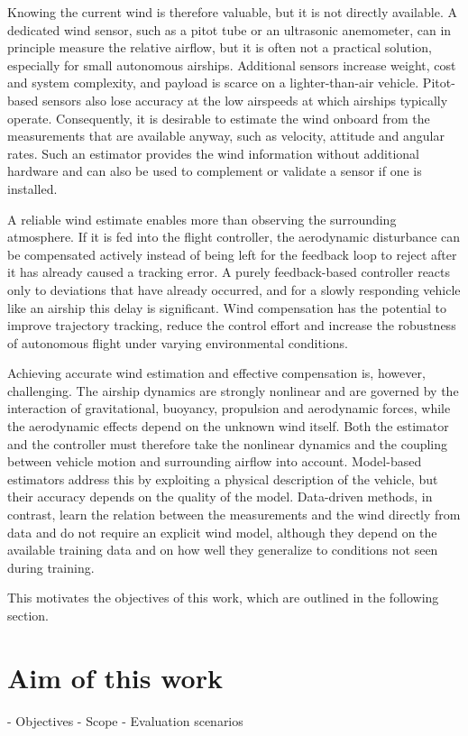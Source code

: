 Knowing the current wind is therefore valuable, but it is not directly available. A dedicated wind sensor, such as a pitot tube or an ultrasonic anemometer, can in principle measure the relative airflow, but it is often not a practical solution, especially for small autonomous airships. Additional sensors increase weight, cost and system complexity, and payload is scarce on a lighter-than-air vehicle. Pitot-based sensors also lose accuracy at the low airspeeds at which airships typically operate. Consequently, it is desirable to estimate the wind onboard from the measurements that are available anyway, such as velocity, attitude and angular rates. Such an estimator provides the wind information without additional hardware and can also be used to complement or validate a sensor if one is installed.

A reliable wind estimate enables more than observing the surrounding atmosphere. If it is fed into the flight controller, the aerodynamic disturbance can be compensated actively instead of being left for the feedback loop to reject after it has already caused a tracking error. A purely feedback-based controller reacts only to deviations that have already occurred, and for a slowly responding vehicle like an airship this delay is significant. Wind compensation has the potential to improve trajectory tracking, reduce the control effort and increase the robustness of autonomous flight under varying environmental conditions.

Achieving accurate wind estimation and effective compensation is, however, challenging. The airship dynamics are strongly nonlinear and are governed by the interaction of gravitational, buoyancy, propulsion and aerodynamic forces, while the aerodynamic effects depend on the unknown wind itself. Both the estimator and the controller must therefore take the nonlinear dynamics and the coupling between vehicle motion and surrounding airflow into account. Model-based estimators address this by exploiting a physical description of the vehicle, but their accuracy depends on the quality of the model. Data-driven methods, in contrast, learn the relation between the measurements and the wind directly from data and do not require an explicit wind model, although they depend on the available training data and on how well they generalize to conditions not seen during training.

This motivates the objectives of this work, which are outlined in the following section.


\section{Aim of this work}
\label{sec:Aim}
- Objectives
- Scope
- Evaluation scenarios

